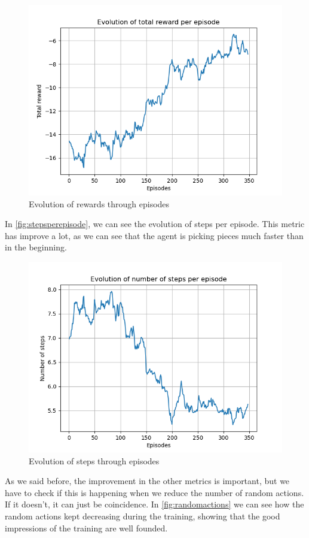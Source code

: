 	\begin{figure}[H]
		\centering
		\includegraphics[width=0.7\linewidth]{Images/original_algorithm/reward_per_episode}
		\caption[Reward per episode]{Evolution of rewards through episodes}
		\label{fig:rewardperepisode}
	\end{figure}

	In \autoref{fig:stepsperepisode}, we can see the evolution of steps per episode. This metric has improve a lot, as we can see that the agent is picking pieces much faster than in the beginning.
	
	\begin{figure}[H]
		\centering
		\includegraphics[width=0.7\linewidth]{Images/original_algorithm/steps_per_episode}
		\caption[Steps per episode]{Evolution of steps through episodes}
		\label{fig:stepsperepisode}
	\end{figure}

	As we said before, the improvement in the other metrics is important, but we have to check if this is happening when we reduce the number of random actions. If it doesn't, it can just be coincidence. In \autoref{fig:randomactions} we can see how the random actions kept decreasing during the training, showing that the good impressions of the training are well founded.
	
